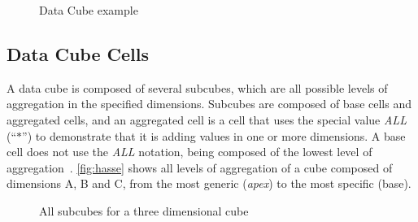 \begin{figure}[!htb]
  \caption{Data Cube example}\label{fig:cubeexample}
  \vspace{2mm}
  \begin{center}
  \end{center}
  \vspace{1mm}
  \legenda{}
\end{figure}

\subsection{Data Cube Cells}\label{ch:fun:cube:cells}

A data cube is composed of several subcubes, which are all possible levels of aggregation in the specified dimensions.
Subcubes are composed of base cells and aggregated cells, and an aggregated cell is a cell that uses the special value \textit{ALL} (``$*$'') to demonstrate that it is adding values in one or more dimensions.
A base cell does not use the \textit{ALL} notation, being composed of the lowest level of aggregation~\cite{limaSEQUENTIALPARALLELAPPROACHES2009}.
\autoref{fig:hasse} shows all levels of aggregation of a cube composed of dimensions A, B and C, from the most generic (\textit{apex}) to the most specific (base).

\begin{figure}[!htb]
  \caption{All subcubes for a three dimensional cube}\label{fig:hasse}
  \vspace{2mm}
  \begin{center}
  \end{center}
  \vspace{1mm}
\end{figure}

